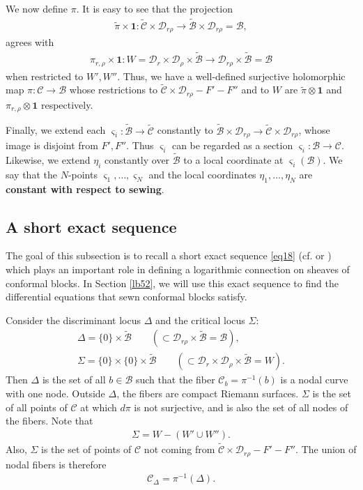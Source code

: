 \documentclass[11pt,b5paper,notitlepage]{article}
\theoremstyle{definition}
\theoremstyle{plain}
\newcommand{\mc}{\mathcal}
\newcommand{\wtd}{\widetilde}
\newcommand{\id}{\mathbf{1}}
\newcommand{\sgm}{\varsigma}
\numberwithin{equation}{section}
\begin{document}
We now define $\pi$. It is easy to see that the projection
\begin{align}
\wtd\pi\times \id:\wtd{\mc C}\times \mc D_{r\rho}\rightarrow \wtd{\mc B}\times \mc D_{r\rho}=\mc B, \label{eq68}
\end{align}
agrees with
\begin{gather}
\pi_{r,\rho}\times \id:W=\mc D_{r}\times\mc D_{\rho}\times\wtd{\mc B}\rightarrow \mc D_{r\rho}\times\wtd{\mc B}=\mc B \label{eq69}
\end{gather}
when restricted to $W',W''$.  Thus, we have a well-defined surjective holomorphic map $\pi:\mc C\rightarrow\mc B$ whose  restrictions to $\wtd{\mc C}\times \mc D_{r\rho}-F'-F''$ and to  $W$ are $\wtd\pi\otimes\id$ and $\pi_{r,\rho}\otimes\id$ respectively. 

Finally, we extend each $\sgm_i:\wtd{\mc B}\rightarrow\wtd{\mc C}$ constantly to $\wtd{\mc B}\times\mc D_{r\rho}\rightarrow\wtd{\mc C}\times\mc D_{r\rho}$, whose image is disjoint from $F',F''$. Thus $\sgm_i$ can be regarded as a section $\sgm_i:\mc B\rightarrow\mc C$. Likewise, we extend $\eta_i$ constantly over $\wtd{\mc B}$ to a local coordinate at $\sgm_i(\mc B)$. We say that  the $N$-points $\sgm_1,\dots,\sgm_N$ and the local coordinates $\eta_1,\dots,\eta_N$ are \textbf{constant with respect to sewing}. 



\subsection*{A short exact sequence}


The goal of this subsection is to recall a short exact sequence \eqref{eq18} (cf. \cite[Eq. (4.2.3)]{Ueno97} or \cite[Eq. (4.6)]{AU07}) which plays an important role in defining a logarithmic connection on sheaves of conformal blocks. In Section \ref{lb52}, we will use this exact sequence to find the differential equations that sewn conformal blocks satisfy.

Consider the discriminant locus $\Delta$ and the critical locus $\Sigma$:  
\begin{gather*}
\Delta=\{0\}\times\wtd{\mc B}\qquad (\subset\mc D_{r\rho}\times\wtd{\mc B}=\mc B),\\
\Sigma=\{0\}\times\{0\}\times\wtd{\mc B}\qquad (\subset\mc D_r\times\mc D_\rho\times\wtd{\mc B}=W).
\end{gather*}
Then $\Delta$ is the set of all $b\in\mc B$ such that the fiber $\mc C_b=\pi^{-1}(b)$ is a nodal curve with one node. Outside $\Delta$, the fibers are compact Riemann surfaces. $\Sigma$ is the set of all points of $\mc C$ at which $d\pi$ is not surjective, and is also the set of all nodes of the fibers. Note that
\begin{align*}
\Sigma=W-(W'\cup W'').
\end{align*}
Also, $\Sigma$ is  the set of points of $\mc C$ not coming from $\wtd{\mc C}\times \mc D_{r\rho}-F'- F''$. The union of nodal fibers is \index{C@$\mc C_\Delta$} therefore
\begin{align*}
\mc C_\Delta=\pi^{-1}(\Delta).
\end{align*}
\end{document}
